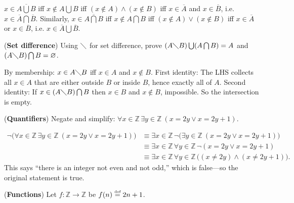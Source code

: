 \documentclass[solutions,answers]{exam}
\providecommand{\Z}{\ensuremath{\mathbb{Z}}}%
\providecommand{\land}{\ensuremath{\wedge}}
\providecommand{\lor}{\ensuremath{\vee}}
\providecommand{\intersect}{\ensuremath{\bigcap}}
\providecommand{\less}{\ensuremath{\diagdown}}
\providecommand{\union}{\ensuremath{\bigcup}}
\providecommand{\define}{\ensuremath{\stackrel{\text{\tiny def}}{=}}}
\begin{document}
\begin{questions}
\begin{solution}
$x\in\overline{A\union B}$ iff $x\notin A\union B$ iff $(x\notin A)\land(x\notin B)$ iff $x\in\overline{A}$ and $x\in\overline{B}$, i.e. $x\in \overline{A}\intersect\overline{B}$.  
Similarly, $x\in\overline{A\intersect B}$ iff $x\notin A\intersect B$ iff $(x\notin A)\lor(x\notin B)$ iff $x\in\overline{A}$ or $x\in\overline{B}$, i.e. $x\in \overline{A}\union\overline{B}$.
\end{solution}

\question[4]
(\textbf{Set difference}) Using $\less$ for set difference, prove $(A\less B)\union(A\intersect B)=A$ and $(A\less B)\intersect B=\varnothing$.

\begin{solution}
By membership: $x\in A\less B$ iff $x\in A$ and $x\notin B$.  
First identity: The LHS collects all $x\in A$ that are either outside $B$ or inside $B$, hence exactly all of $A$.  
Second identity: If $x\in (A\less B)\intersect B$ then $x\in B$ and $x\notin B$, impossible. So the intersection is empty.
\end{solution}

\question[4]
(\textbf{Quantifiers}) Negate and simplify: $\forall x\in \Z\, \exists y\in \Z\ (x=2y \lor x=2y+1)$.

\begin{solution}
\begin{align}
\lnot\Big(\forall x\in \Z\, \exists y\in \Z\ (x=2y \lor x=2y+1)\Big)
&\equiv \exists x\in \Z\, \lnot\Big(\exists y\in \Z\ (x=2y \lor x=2y+1)\Big)\\
&\equiv \exists x\in \Z\, \forall y\in \Z\, \lnot(x=2y \lor x=2y+1)\\
&\equiv \exists x\in \Z\, \forall y\in \Z\, \big((x\ne 2y)\land(x\ne 2y+1)\big).
\end{align}
This says “there is an integer not even and not odd,” which is false—so the original statement is true.
\end{solution}

\question[6]
(\textbf{Functions}) Let $f:\Z\to \Z$ be $f(n)\define 2n+1$.
\end{questions}
\end{document}
